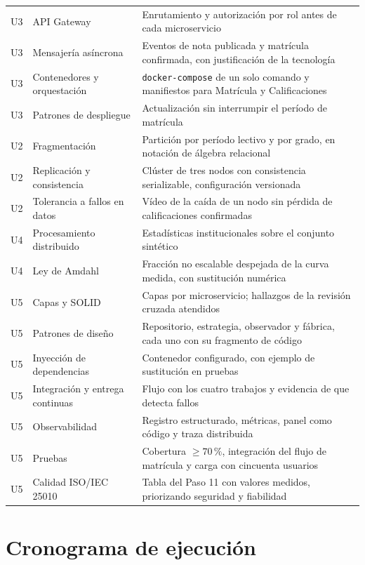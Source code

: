 \documentclass[11pt,a4paper]{article}
\begin{document}
\begin{center}
\begin{longtable}{@{}p{1.1cm}p{4.9cm}p{8.9cm}@{}}
			U3 & API Gateway & Enrutamiento y autorización por rol antes de cada microservicio \\
			U3 & Mensajería asíncrona & Eventos de nota publicada y matrícula confirmada, con justificación de la tecnología \\
			U3 & Contenedores y orquestación & \texttt{docker-compose} de un solo comando y manifiestos para Matrícula y Calificaciones \\
			U3 & Patrones de despliegue & Actualización sin interrumpir el período de matrícula \\
			U2 & Fragmentación & Partición por período lectivo y por grado, en notación de álgebra relacional \\
			U2 & Replicación y consistencia & Clúster de tres nodos con consistencia serializable, configuración versionada \\
			U2 & Tolerancia a fallos en datos & Vídeo de la caída de un nodo sin pérdida de calificaciones confirmadas \\
			U4 & Procesamiento distribuido & Estadísticas institucionales sobre el conjunto sintético \\
			U4 & Ley de Amdahl & Fracción no escalable despejada de la curva medida, con sustitución numérica \\
			U5 & Capas y SOLID & Capas por microservicio; hallazgos de la revisión cruzada atendidos \\
			U5 & Patrones de diseño & Repositorio, estrategia, observador y fábrica, cada uno con su fragmento de código \\
			U5 & Inyección de dependencias & Contenedor configurado, con ejemplo de sustitución en pruebas \\
			U5 & Integración y entrega continuas & Flujo con los cuatro trabajos y evidencia de que detecta fallos \\
			U5 & Observabilidad & Registro estructurado, métricas, panel como código y traza distribuida \\
			U5 & Pruebas & Cobertura $\geq 70\,\%$, integración del flujo de matrícula y carga con cincuenta usuarios \\
			U5 & Calidad ISO/IEC 25010 & Tabla del Paso 11 con valores medidos, priorizando seguridad y fiabilidad \\
			\bottomrule
		\end{longtable}
	\end{center}
	
	\section{Cronograma de ejecución}
	
\end{document}

